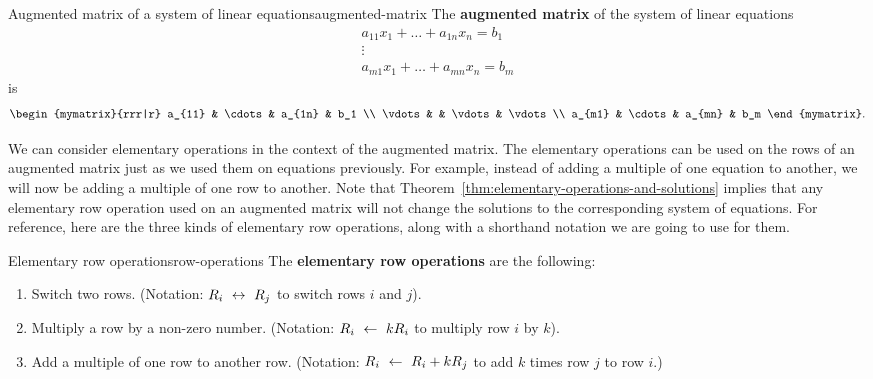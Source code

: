 \begin{definition}{Augmented matrix of a system of linear equations}{augmented-matrix}
  The \textbf{augmented matrix}
  of the system of linear equations
  \begin{equation*}
    \begin{array}{c}
      a_{11}x_1 + \ldots + a_{1n}x_n = b_1 \\
      \vdots \\
      a_{m1}x_1 + \ldots + a_{mn}x_n = b_m
    \end{array}
  \end{equation*}
  is
  \begin{equation*}
    \begin{mymatrix}{rrr|r}
      a_{11} & \cdots & a_{1n} &  b_1 \\
      \vdots &  & \vdots &  \vdots \\
      a_{m1} & \cdots & a_{mn} &  b_m
    \end{mymatrix}.
  \end{equation*}
\end{definition}

We can consider elementary operations in the context of the augmented
matrix. The elementary operations can be used on the rows of an
augmented matrix just as we used them on equations previously. For
example, instead of adding a multiple of one equation to another, we
will now be adding a multiple of one row to another. Note that
Theorem~\ref{thm:elementary-operations-and-solutions} implies that any
elementary row operation used on an augmented matrix will not change
the solutions to the corresponding system of equations. For reference,
here are the three kinds of elementary row operations, along with a
shorthand notation we are going to use for them.

\begin{definition}{Elementary row operations}{row-operations}
  The \textbf{elementary row operations}%
   are the
  following:
  \begin{enumerate}
  \item Switch two rows. (Notation: $R_i~\leftrightarrow~ R_j$ to switch
    rows $i$ and $j$).
  \item Multiply a row by a non-zero number.  (Notation: $R_i~\leftarrow~
    kR_i$ to multiply row $i$ by $k$).
  \item Add a multiple of one row to another row. (Notation:
    $R_i~\leftarrow~ R_i+kR_j$ to add $k$ times row $j$ to row $i$.)
  \end{enumerate}
\end{definition}

